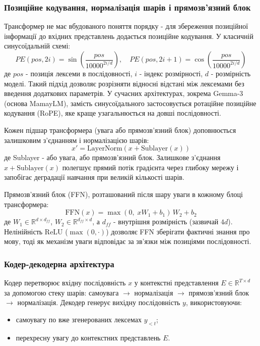 \documentclass[14pt]{extarticle}
\begin{document}
\subsubsection{Позиційне кодування, нормалізація шарів і прямозв'язний блок}

Трансформер не має вбудованого поняття порядку - для збереження позиційної інформації до вхідних представлень додається позиційне кодування. У класичній синусоїдальній схемі:
\begin{equation}
  PE(pos, 2i) = \sin\!\left(\frac{pos}{10000^{2i/d}}\right), \quad
  PE(pos, 2i+1) = \cos\!\left(\frac{pos}{10000^{2i/d}}\right)
  \label{eq:pe}
\end{equation}
де $pos$ - позиція лексеми в послідовності, $i$ - індекс розмірності, $d$ - розмірність моделі. Такий підхід дозволяє розрізняти відносні відстані між лексемами без введення додаткових параметрів. У сучасних архітектурах, зокрема Gemma-3 (основа MamayLM), замість синусоїдального застосовується ротаційне позиційне кодування (RoPE), яке краще узагальнюється на довші послідовності.

Кожен підшар трансформера (увага або прямозв'язний блок) доповнюється залишковим з'єднанням і нормалізацією шарів:
\begin{equation}
  x' = \text{LayerNorm}(x + \text{Sublayer}(x))
  \label{eq:layernorm}
\end{equation}
де Sublayer - або увага, або прямозв'язний блок. Залишкове з'єднання $x + \text{Sublayer}(x)$ полегшує прямий потік градієнта через глибоку мережу і запобігає деградації навчання при великій кількості шарів.

Прямозв'язний блок (FFN), розташований після шару уваги в кожному блоці трансформера:
\begin{equation}
  \text{FFN}(x) = \max(0,\; xW_1 + b_1)\,W_2 + b_2
  \label{eq:ffn}
\end{equation}
де $W_1 \in \mathbb{R}^{d \times d_{ff}}$, $W_2 \in \mathbb{R}^{d_{ff} \times d}$, а $d_{ff}$ - внутрішня розмірність (зазвичай $4d$). Нелінійність ReLU ($\max(0, \cdot)$) дозволяє FFN зберігати фактичні знання про мову, тоді як механізм уваги відповідає за зв'язки між позиціями послідовності.

\subsubsection{Кодер-декодерна архітектура}

Кодер перетворює вхідну послідовність $x$ у контекстні представлення $E \in \mathbb{R}^{T \times d}$ за допомогою стеку шарів: самоувага $\to$ нормалізація $\to$ прямозв'язний блок $\to$ нормалізація. Декодер генерує вихідну послідовність $y$, використовуючи:
\begin{itemize}
  \item самоувагу по вже згенерованих лексемах $y_{<t}$;
  \item перехресну увагу до контекстних представлень $E$.
\end{itemize}
\end{document}
